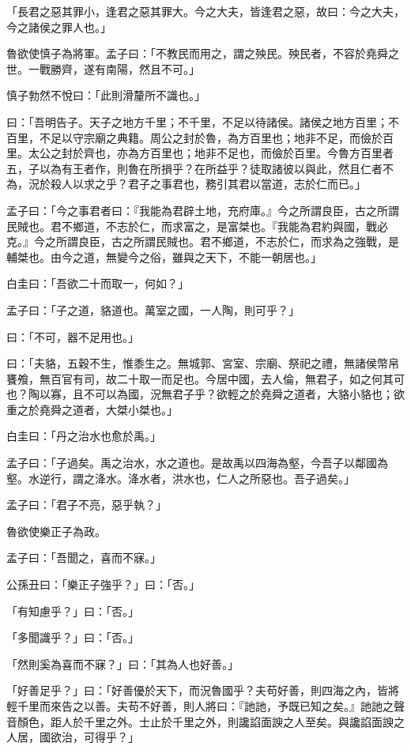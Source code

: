 \documentclass[12pt,a4paper]{ctexbook}
\begin{document}
「長君之惡其罪小，逢君之惡其罪大。今之大夫，皆逢君之惡，故曰：今之大夫，今之諸侯之罪人也。」\par
魯欲使慎子為將軍。孟子曰：「不教民而用之，謂之殃民。殃民者，不容於堯舜之世。一戰勝齊，遂有南陽，然且不可。」\par
慎子勃然不悅曰：「此則滑釐所不識也。」\par
曰：「吾明告子。天子之地方千里；不千里，不足以待諸侯。諸侯之地方百里；不百里，不足以守宗廟之典籍。周公之封於魯，為方百里也；地非不足，而儉於百里。太公之封於齊也，亦為方百里也；地非不足也，而儉於百里。今魯方百里者五，子以為有王者作，則魯在所損乎？在所益乎？徒取諸彼以與此，然且仁者不為，況於殺人以求之乎？君子之事君也，務引其君以當道，志於仁而已。」\par
孟子曰：「今之事君者曰：『我能為君辟土地，充府庫。』今之所謂良臣，古之所謂民賊也。君不鄉道，不志於仁，而求富之，是富桀也。『我能為君約與國，戰必克。』今之所謂良臣，古之所謂民賊也。君不鄉道，不志於仁，而求為之強戰，是輔桀也。由今之道，無變今之俗，雖與之天下，不能一朝居也。」\par
白圭曰：「吾欲二十而取一，何如？」\par
孟子曰：「子之道，貉道也。萬室之國，一人陶，則可乎？」\par
曰：「不可，器不足用也。」\par
曰：「夫貉，五穀不生，惟黍生之。無城郭、宮室、宗廟、祭祀之禮，無諸侯幣帛饔飧，無百官有司，故二十取一而足也。今居中國，去人倫，無君子，如之何其可也？陶以寡，且不可以為國，況無君子乎？欲輕之於堯舜之道者，大貉小貉也；欲重之於堯舜之道者，大桀小桀也。」\par
白圭曰：「丹之治水也愈於禹。」\par
孟子曰：「子過矣。禹之治水，水之道也。是故禹以四海為壑，今吾子以鄰國為壑。水逆行，謂之洚水。洚水者，洪水也，仁人之所惡也。吾子過矣。」\par
孟子曰：「君子不亮，惡乎執？」\par
魯欲使樂正子為政。\par
孟子曰：「吾聞之，喜而不寐。」\par
公孫丑曰：「樂正子強乎？」曰：「否。」\par
「有知慮乎？」曰：「否。」\par
「多聞識乎？」曰：「否。」\par
「然則奚為喜而不寐？」曰：「其為人也好善。」\par
「好善足乎？」曰：「好善優於天下，而況魯國乎？夫苟好善，則四海之內，皆將輕千里而來告之以善。夫苟不好善，則人將曰：『訑訑，予既已知之矣。』訑訑之聲音顏色，距人於千里之外。士止於千里之外，則讒諂面諛之人至矣。與讒諂面諛之人居，國欲治，可得乎？」\par
\end{document}
